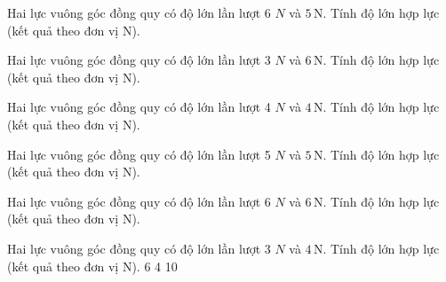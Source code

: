 \begin{bt}
Hai lực vuông góc đồng quy có độ lớn lần lượt 6 $N$ và $5\,\text{N}$. Tính độ lớn hợp lực (kết quả theo đơn vị N).
\end{bt}

\begin{bt}
Hai lực vuông góc đồng quy có độ lớn lần lượt 3 $N$ và $6\,\text{N}$. Tính độ lớn hợp lực (kết quả theo đơn vị N).
\end{bt}

\begin{bt}
Hai lực vuông góc đồng quy có độ lớn lần lượt 4 $N$ và $4\,\text{N}$. Tính độ lớn hợp lực (kết quả theo đơn vị N).
\end{bt}

\begin{bt}
Hai lực vuông góc đồng quy có độ lớn lần lượt 5 $N$ và $5\,\text{N}$. Tính độ lớn hợp lực (kết quả theo đơn vị N).
\end{bt}

\begin{bt}
Hai lực vuông góc đồng quy có độ lớn lần lượt 6 $N$ và $6\,\text{N}$. Tính độ lớn hợp lực (kết quả theo đơn vị N).
\end{bt}

\begin{ex}
Hai lực vuông góc đồng quy có độ lớn lần lượt 3 $N$ và $4\,\text{N}$. Tính độ lớn hợp lực (kết quả theo đơn vị N).
\choice
{}
{6}
{4}
{10}
\end{ex}

